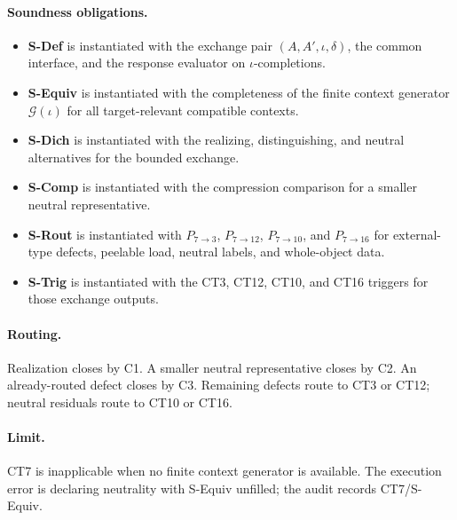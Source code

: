 \documentclass[
  11pt,
]{article}
\providecommand{\tightlist}{%
  \setlength{\itemsep}{0pt}\setlength{\parskip}{0pt}}
\theoremstyle{definition}
\newcommand{\ctpar}[1]{\paragraph{#1.}}
\begin{document}
\ctpar{Soundness obligations}
\begin{itemize}
\tightlist
\item \textbf{S-Def} is instantiated with the exchange pair \((A,A',\iota,\delta)\), the common interface, and the response evaluator on \(\iota\)-completions.
\item \textbf{S-Equiv} is instantiated with the completeness of the finite context generator \(\mathcal G(\iota)\) for all target-relevant compatible contexts.
\item \textbf{S-Dich} is instantiated with the realizing, distinguishing, and neutral alternatives for the bounded exchange.
\item \textbf{S-Comp} is instantiated with the compression comparison for a smaller neutral representative.
\item \textbf{S-Rout} is instantiated with \(P_{7\to3}\), \(P_{7\to12}\), \(P_{7\to10}\), and \(P_{7\to16}\) for external-type defects, peelable load, neutral labels, and whole-object data.
\item \textbf{S-Trig} is instantiated with the CT3, CT12, CT10, and CT16 triggers for those exchange outputs.
\end{itemize}

\ctpar{Routing}
Realization closes by C1.  A smaller neutral representative closes by
C2.  An already-routed defect closes by C3.  Remaining defects route to
CT3 or CT12; neutral residuals route to CT10 or CT16.

\ctpar{Limit}
CT7 is inapplicable when no finite context generator is available. The
execution error is declaring neutrality with S-Equiv unfilled; the audit
records CT7/S-Equiv.
\end{document}
